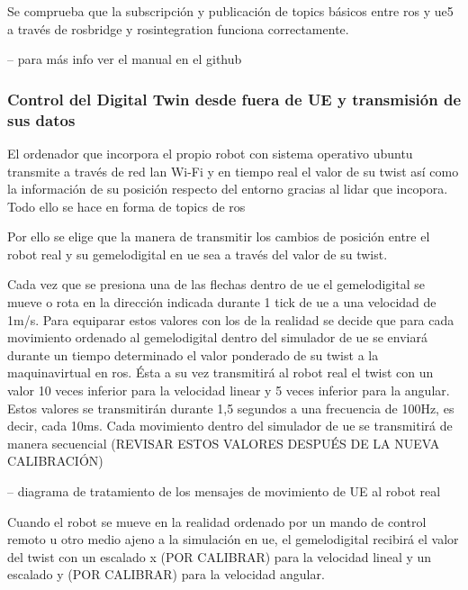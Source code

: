 \documentclass[a4paper, 12pt, spanish, twoside]{article}
\begin{document}
Se comprueba que la subscripción y publicación de \glspl{topic} básicos entre \acrshort{ros} y \acrshort{ue}5 a través de \gls{rosbridge} y \gls{rosintegration} funciona correctamente. 

-- para más info ver el manual en el github 

\subsubsection{Control del Digital Twin desde fuera de UE y transmisión de sus datos} \label{sec:implementacion:nerfstudio-volinga:control}

El ordenador que incorpora el propio robot con sistema operativo \gls{ubuntu} transmite a través de red \acrshort{lan} Wi-Fi y en tiempo real el valor de su \gls{twist} así como la información de su posición respecto del entorno gracias al \acrshort{lidar} que incopora. Todo ello se hace en forma de \glspl{topic} de \acrshort{ros} 

Por ello se elige que la manera de transmitir los cambios de posición entre el robot real y su \gls{gemelodigital} en \acrshort{ue} sea a través del valor de su \gls{twist}. 

Cada vez que se presiona una de las flechas dentro de \acrshort{ue} el \gls{gemelodigital} se mueve o rota en la dirección indicada durante 1 \gls{tick} de \acrshort{ue} a una velocidad de 1m/s. Para equiparar estos valores con los de la realidad se decide que para cada movimiento ordenado al \gls{gemelodigital} dentro del simulador de \acrshort{ue} se enviará durante un tiempo determinado el valor ponderado de su \gls{twist} a la \gls{maquinavirtual} en \acrshort{ros}. Ésta a su vez transmitirá al robot real el \gls{twist} con un valor 10 veces inferior para la velocidad linear y 5 veces inferior para la angular. Estos valores se transmitirán durante 1,5 segundos a una frecuencia de 100Hz, es decir, cada 10ms. Cada movimiento dentro del simulador de \acrshort{ue} se transmitirá de manera secuencial (REVISAR ESTOS VALORES DESPUÉS DE LA NUEVA CALIBRACIÓN) 

-- diagrama de tratamiento de los mensajes de movimiento de UE al robot real 

Cuando el robot se mueve en la realidad ordenado por un mando de control remoto u otro medio ajeno a la simulación en \acrshort{ue}, el \gls{gemelodigital} recibirá el valor del \gls{twist} con un escalado x (POR CALIBRAR) para la velocidad lineal y un escalado y (POR CALIBRAR) para la velocidad angular. 
\end{document}
